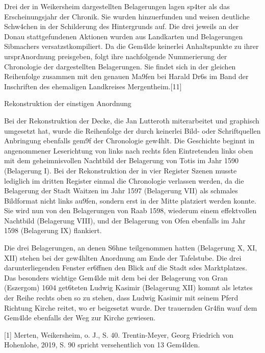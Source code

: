 \documentclass[
  letterpaper,
]{book}
\begin{document}
Drei der in Weikersheim dargestellten Belagerungen lagen sp\xa4ter
als das Erscheinungsjahr der Chronik. Sie wurden hinzuerfunden und
weisen deutliche Schw\xa4chen in der Schilderung des Hintergrunds
auf. Die drei jeweils an der Donau stattgefundenen Aktionen wurden aus
Landkarten und Belagerungen Sibmachers
versatzst\xbcckhaft kompiliert. Da die Gem\xa4lde keinerlei
Anhaltspunkte zu ihrer urspr\xbcnglichen Anordnung preisgeben, folgt
ihre nachfolgende Nummerierung der Chronologie der dargestellten
Belagerungen. Sie findet sich in der gleichen Reihenfolge zusammen mit
den genauen Ma\x9fen bei Harald Dr\xb6s im Band der Inschriften
des ehemaligen Landkreises Mergentheim.{[}11{]}

Rekonstruktion der einstigen Anordnung

Bei der Rekonstruktion der Decke, die Jan Lutteroth miterarbeitet und
graphisch umgesetzt hat, wurde die Reihenfolge der durch keinerlei Bild-
oder Schriftquellen \xbcberlieferten Anbringung ebenfalls
gem\x9f der Chronologie gew\xa4hlt. Die Geschichte
beginnt in angenommener Leserichtung von links nach rechts
f\xbcr den Eintretenden links oben mit dem geheimnisvollen Nachtbild
der Belagerung von Totis im Jahr 1590 (Belagerung I). Bei der
Rekonstruktion der in vier Register \xbcbereinanderliegenden Szenen
musste lediglich im dritten Register einmal die Chronologie verlassen
werden, da die Belagerung der Stadt Waitzen im Jahr 1597 (Belagerung
VII) als schmales Bildformat nicht links au\x9fen, sondern erst in
der Mitte platziert werden konnte. Sie wird nun von den Belagerungen von
Raab 1598, wiederum einem effektvollen Nachtbild (Belagerung VIII), und
der Belagerung von Ofen ebenfalls im Jahr 1598 (Belagerung IX)
flankiert.

Die drei Belagerungen, an denen S\xb6hne teilgenommen hatten
(Belagerung X, XI, XII) stehen bei der gew\xa4hlten Anordnung am
Ende der Tafelstube. Die drei darunterliegenden Fenster er\xb6ffnen
den Blick auf die Stadt s\xbcdlich des Marktplatzes. Das besonders
wichtige Gem\xa4lde mit dem bei der Belagerung von Gran (Eszergom)
1604 get\xb6teten Ludwig Kasimir (Belagerung XII) kommt als letztes
der Reihe rechts oben so zu stehen, dass Ludwig Kasimir mit seinem Pferd
Richtung Kirche reitet, wo er beigesetzt wurde. Der trauernden
Gr\xa4fin w\xbcrde auf dem Gem\xa4lde ebenfalls der Weg zur
Kirche gewiesen.

{[}1{]} Merten, Weikersheim, o. J., S. 40. Trentin-Meyer, Georg
Friedrich von Hohenlohe, 2019, S. 90 spricht versehentlich von 13
Gem\xa4lden.
\end{document}
